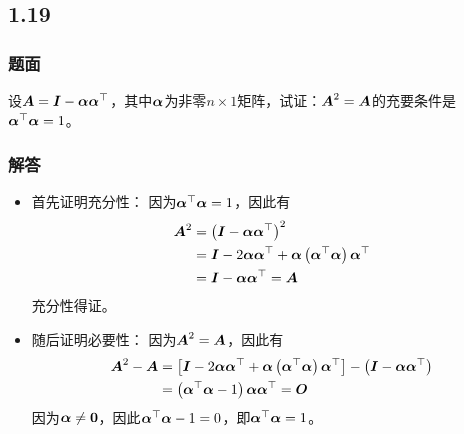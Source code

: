 \documentclass[9pt,xcolor=svgnames]{beamer} %
\begin{document}
\subsection*{1.19}
\begin{frame}
    \frametitle{题面}
    设\(\mata=\mati-\vecal\vecal^\top\)，其中\(\vecal\)为非零\(n\times1\)矩阵，试证：\(\mata^2=\mata\)的充要条件是\(\vecal^\top\vecal=1\)。
\end{frame}
\begin{frame}
    \frametitle{解答}
    \begin{itemize}
        \item 首先证明充分性：
              因为\(\vecal^\top\vecal=1\)，因此有
              \begin{align*}
                  \mata^2 & =\spar{\mati-\vecal\vecal^\top}^2                                   \\
                          & =\mati-2\vecal\vecal^\top+\vecal\spar{\vecal^\top\vecal}\vecal^\top \\
                          & =\mati-\vecal\vecal^\top=\mata
              \end{align*}
              充分性得证。

        \item 随后证明必要性：
              因为\(\mata^2=\mata\)，因此有
              \begin{align*}
                  \mata^2-\mata & =\mat{\mati-2\vecal\vecal^\top+\vecal\spar{\vecal^\top\vecal}\vecal^\top}-\spar{\mati-\vecal\vecal^\top} \\
                                & =\spar{\vecal^\top\vecal-1}\vecal\vecal^\top=\mato
              \end{align*}
              因为\(\vecal\neq\veczero\)，因此\(\vecal^\top\vecal-1=0\)，即\(\vecal^\top\vecal=1\)。
    \end{itemize}
\end{frame}
\end{document}
